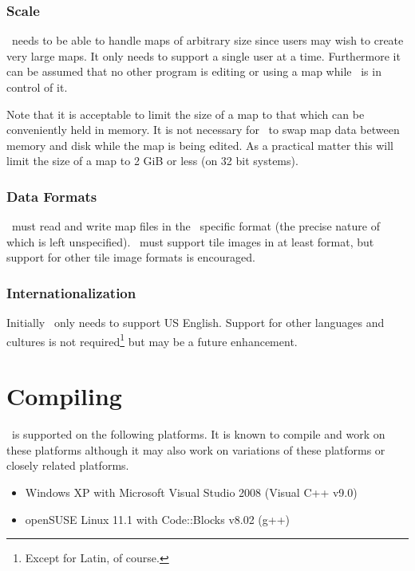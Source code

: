 \subsubsection*{Scale}

\MapEditor\ needs to be able to handle maps of arbitrary size since users may wish to create very large maps. It only needs to support a single user at a time. Furthermore it can be assumed that no other program is editing or using a map while \MapEditor\ is in control of it.

Note that it is acceptable to limit the size of a map to that which can be conveniently held in memory. It is not necessary for \MapEditor\ to swap map data between memory and disk while the map is being edited. As a practical matter this will limit the size of a map to 2 GiB or less (on 32 bit systems).

\subsubsection*{Data Formats}

\MapEditor\ must read and write map files in the \VTank\ specific  format (the precise nature of which is left unspecified). \MapEditor\ must support tile images in at least  format, but support for other tile image formats is encouraged.

\subsubsection*{Internationalization}

Initially \MapEditor\ only needs to support US English. Support for other languages and cultures is not required\footnote{Except for Latin, of course.} but may be a future enhancement.

\section{Compiling}

\MapEditor\ is supported on the following platforms. It is known to compile and work on these platforms although it may also work on variations of these platforms or closely related platforms.

\begin{itemize}
\item Windows XP with Microsoft Visual Studio 2008 (Visual C++ v9.0)
\item openSUSE Linux 11.1 with Code::Blocks v8.02 (g++)
\end{itemize}

